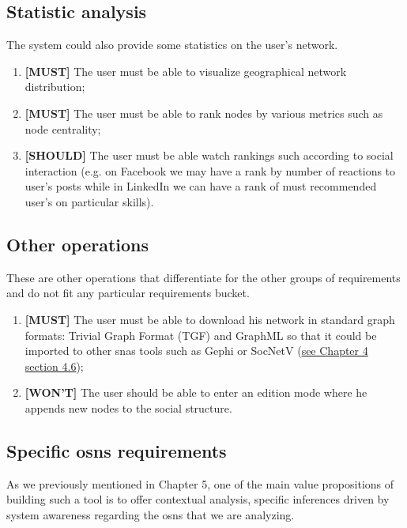 \subsection{Statistic analysis}

The system could also provide some statistics on the user's network.

\begin{enumerate}
    \item \textbf{[MUST]} The user must be able to visualize geographical network distribution;
    \item \textbf{[MUST]} The user must be able to rank nodes by various metrics such as node centrality;
    \item \textbf{[SHOULD]} The user must be able watch rankings such according to social interaction (e.g. on Facebook we may have a rank by number of reactions to user's posts while in LinkedIn we can have a rank of must recommended user's on particular skills).
\end{enumerate}

\subsection{Other operations}

These are other operations that differentiate for the other groups of requirements and do not fit any particular requirements bucket.

\begin{enumerate}
    \item \textbf{[MUST]} The user must be able to download his network in standard graph formats: Trivial Graph Format (TGF) and GraphML so that it could
    be imported to other \glspl{sna} tools such as Gephi or SocNetV (\hyperref[sec:snas]{see Chapter 4 section 4.6});
    \item \textbf{[WON'T]} The user should be able to enter an edition mode where he appends new nodes to the social structure.
\end{enumerate}


\subsection{Specific \glspl{osn} requirements}

As we previously mentioned in Chapter 5, one of the main value propositions of building such a tool is to offer contextual analysis, specific inferences driven
by system awareness regarding the \glspl{osn} that we are analyzing.

